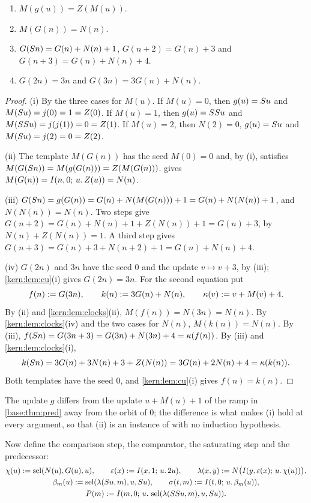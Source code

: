 \begin{lemma}
\label{kern:lem:ramp}
\begin{enumerate}[label=\textup{(\roman*)}]
\item $M(g(u))=Z(M(u))$.
\item $M(G(n))=N(n)$.
\item $G(S n)=G(n)+N(n)+1$, $G(n+2)=G(n)+3$ and
 $G(n+3)=G(n)+N(n)+4$.
\item $G(2n)=3n$ and $G(3n)=3G(n)+N(n)$.
\end{enumerate}
\end{lemma}

\begin{proof}
(i) By the three cases for $M(u)$.  If $M(u)=0$, then $g(u)=S u$ and
$M(S u)=j(0)=1=Z(0)$.  If $M(u)=1$, then $g(u)=SS u$ and
$M(SS u)=j(j(1))=0=Z(1)$.  If $M(u)=2$, then $N(2)=0$,
$g(u)=S u$ and $M(S u)=j(2)=0=Z(2)$.

(ii) The template $M(G(n))$ has the seed $M(0)=0$ and, by (i), satisfies
$M(G(S n))=M(g(G(n)))=Z(M(G(n)))$.   gives
$M(G(n))=I(n,0;\,u.\,Z(u))=N(n)$.

(iii) $G(S n)=g(G(n))=G(n)+N(M(G(n)))+1=G(n)+N(N(n))+1$, and
$N(N(n))=N(n)$.  Two steps give $G(n+2)=G(n)+N(n)+1+Z(N(n))+1=G(n)+3$,
by $N(n)+Z(N(n))=1$.  A third step gives
$G(n+3)=G(n)+3+N(n+2)+1=G(n)+N(n)+4$.

(iv) $G(2n)$ and $3n$ have the seed $0$ and the update $v\mapsto v+3$, by
(iii); \cref{kern:lem:cu}(i) gives $G(2n)=3n$.  For the second equation put
\[
 f(n)\mathrel{:=} G(3n),\qquad k(n)\mathrel{:=} 3G(n)+N(n),\qquad
 \kappa(v)\mathrel{:=} v+M(v)+4 .
\]
By (ii) and \cref{kern:lem:clocks}(ii), $M(f(n))=N(3n)=N(n)$.  By
\cref{kern:lem:clocks}(iv) and the two cases for $N(n)$, $M(k(n))=N(n)$.
By (iii), $f(S n)=G(3n+3)=G(3n)+N(3n)+4=\kappa(f(n))$.  By (iii) and
\cref{kern:lem:clocks}(i),
\[
 k(S n)=3G(n)+3N(n)+3+Z(N(n))=3G(n)+2N(n)+4=\kappa(k(n)).
\]
Both templates have the seed $0$, and \cref{kern:lem:cu}(i) gives
$f(n)=k(n)$.
\end{proof}

The update $g$ differs from the update $u+M(u)+1$ of the ramp in
\cref{base:thm:pred} away from the orbit of $0$; the difference is what
makes (i) hold at every argument, so that (ii) is an instance of
 with no induction hypothesis.

Now define the comparison step, the comparator, the saturating step and the
predecessor:
\begin{gather*}
 \chi(u)\mathrel{:=}\operatorname{sel}(N(u),G(u),u),\qquad
 \varepsilon(x)\mathrel{:=}I(x,1;\,u.\,2u),\qquad
 \lambda(x,y)\mathrel{:=} N\bigl(I(y,\varepsilon(x);\,u.\,\chi(u))\bigr),\\
 \beta_m(u)\mathrel{:=}\operatorname{sel}(\lambda(S u,m),u,S u),\qquad
 \sigma(t,m)\mathrel{:=}I(t,0;\,u.\,\beta_m(u)),\\
 P(m)\mathrel{:=}I(m,0;\,u.\,\operatorname{sel}(\lambda(SS u,m),u,S u)) .
\end{gather*}

